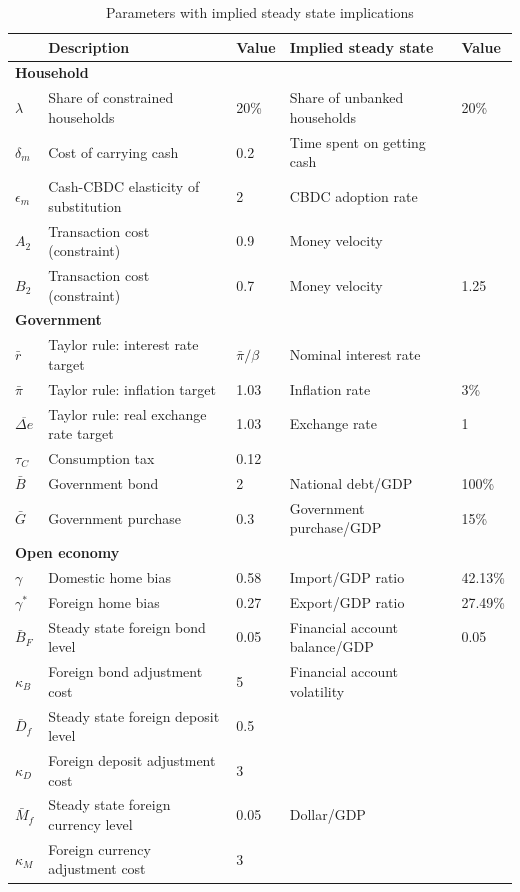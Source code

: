\documentclass[12pt]{article}
\begin{document}
\begin{table}[h!]
\centering
\begin{tabular}{lllll}
\hline\hline
& Description & Value & Implied steady state & Value \\\hline
\multicolumn{5}{l}{\bf Household}     \\
$\lambda$  & Share of constrained households  & 20\%  & Share of unbanked households & 20\%  \\
$\delta_m$ & Cost of carrying cash & 0.2 & Time spent on getting cash \\
$\epsilon_m$ & Cash-CBDC elasticity of substitution &  2 & CBDC adoption rate \\
$A_2$      & Transaction cost (constraint)   & 0.9     & Money velocity    \\
$B_2$     & Transaction cost (constraint)   & 0.7      & Money velocity   & 1.25    \\
\multicolumn{5}{l}{\bf Government}     \\
$\bar{r}$     & Taylor rule: interest rate target            & $\bar{\pi}/\beta$    & Nominal interest rate &      	 \\
$\bar{\pi}$     & Taylor rule: inflation target       & 1.03        & Inflation rate & 3\%                        				 \\
$\overline{\Delta e}$    & Taylor rule: real exchange rate target       & 1.03   & Exchange rate & 1    			  \\
$\tau_C$ & Consumption tax & 0.12 &  \\
$\bar{B}$ & Government bond & 2 & National debt/GDP & 100\% \\
$\bar{G}$ & Government purchase & 0.3 & Government purchase/GDP & 15\% \\
\multicolumn{5}{l}{\bf Open economy} \\
$\gamma$     & Domestic home bias           & 0.58      & Import/GDP ratio             & 	42.13\%                           \\
$\gamma^*$  & Foreign home bias              & 0.27      & Export/GDP ratio             & 27.49\%                                     \\                                                   
$\bar{B}_F$       & Steady state foreign bond level    & 0.05     & Financial account balance/GDP &      0.05              \\
$\kappa_B$     & Foreign bond adjustment cost    & 5       & Financial account volatility &                                       \\
$\bar{D}_f$       & Steady state foreign deposit level   & 0.5  \\
$\kappa_D$      & Foreign deposit adjustment cost     & 3                                         \\
$\bar{M}_f$      & Steady state foreign currency level     & 0.05  &  Dollar/GDP     \\
$\kappa_M$     & Foreign currency adjustment cost     & 3                                         \\      \hline                                    
\end{tabular}
\caption{Parameters with implied steady state implications}
\end{table}
\end{document}
